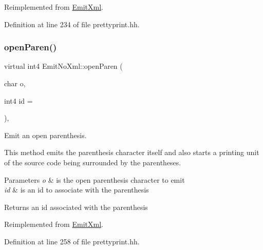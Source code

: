 Reimplemented from \mbox{\hyperlink{class_emit_xml_a8700bdf9d4e073ae392ef722f53ceb45}{Emit\+Xml}}.



Definition at line 234 of file prettyprint.\+hh.

\mbox{\label{class_emit_no_xml_a9a41693087659b738ccdeadaa16d886b}} 
\subsubsection{\texorpdfstring{openParen()}{openParen()}}
{\footnotesize\ttfamily virtual int4 Emit\+No\+Xml\+::open\+Paren (\begin{DoxyParamCaption}\item[{char}]{o,  }\item[{int4}]{id = {} }\end{DoxyParamCaption})\hspace{0.3cm}{\ttfamily [inline]}, {\ttfamily [virtual]}}



Emit an open parenthesis. 

This method emits the parenthesis character itself and also starts a printing unit of the source code being surrounded by the parentheses. 
\begin{DoxyParams}{Parameters}
{\em o} & is the open parenthesis character to emit \\
\hline
{\em id} & is an id to associate with the parenthesis \\
\hline
\end{DoxyParams}
\begin{DoxyReturn}{Returns}
an id associated with the parenthesis 
\end{DoxyReturn}


Reimplemented from \mbox{\hyperlink{class_emit_xml_a4f7e781436dde8754ae5f52c9c5edc47}{Emit\+Xml}}.



Definition at line 258 of file prettyprint.\+hh.

\mbox{\label{class_emit_no_xml_a86cb933b199d3d3cd8823087c1fc1404}} 
